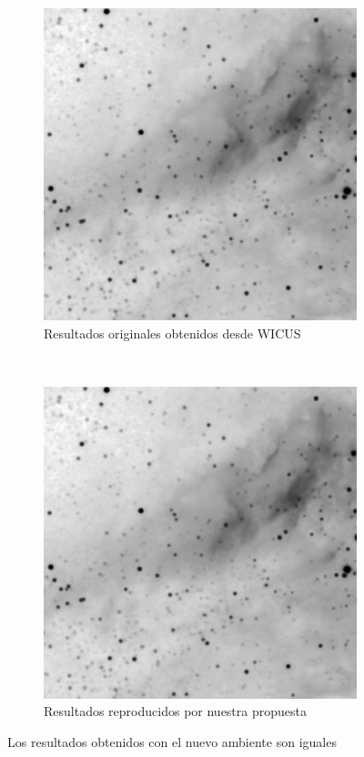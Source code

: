 \begin{figure}[h]
    \centering
    \begin{subfigure}[b]{0.4\textwidth}
         \centering
         \includegraphics[width=\textwidth]{Figures/montage-original}
         \caption{Resultados originales obtenidos desde WICUS}
         \label{fig:montage-wicus}
     \end{subfigure}
         ~ 
	    \begin{subfigure}[b]{0.4\textwidth}
         \centering
         \includegraphics[width=\textwidth]{Figures/montage-mosorio}
         \caption{Resultados reproducidos por nuestra propuesta}
         \label{fig:montage-mosorio}
     \end{subfigure}
        \caption{Los resultados obtenidos con el nuevo ambiente son iguales}
        \label{fig:montage-results}
\end{figure}
